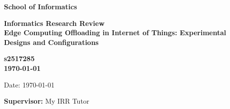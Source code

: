 \documentclass[a4paper,11pt]{article}
\newcommand{\examnumber}{s2517285}
\newcommand{\field}{Edge Computing Offloading in Internet of Things: Experimental Designs and Configurations}
\newcommand{\supervisor}{My IRR Tutor}
\begin{document}
\begin{minipage}[b]{110mm}
        {\Huge\bf School of Informatics
        \vspace*{17mm}}
\end{minipage}
\hfill
\begin{minipage}[t]{40mm}               
\end{minipage}
\par\noindent
\vspace*{2cm}
\begin{center}
        \Large\bf Informatics Research Review \\
        \Large\bf \field
\end{center}
\vspace*{1.5cm}
\begin{center}
        \bf \examnumber\\
        \monthyeardate\today
\end{center}
\vspace*{5mm}

%
%                       
\begin{abstract}
        The abstract is a short concise outline of your 
        project area, {\bf of no more than 100 words}.
\end{abstract}

\vspace*{1cm}

\vspace*{3cm}
Date: \today

\vfill
{\bf Supervisor:} \supervisor
\newpage

\setcounter{page}{1}                            %
\footruleheight{1pt}
\headruleheight{1pt}
\rhead{- \thepage}
\cfoot{}
%
\end{document}
